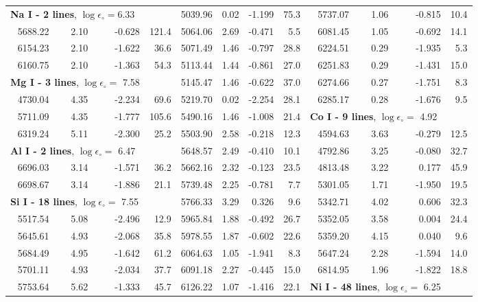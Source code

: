 \documentclass[oldversion]{aa}
\begin{document}
\begin{table}[!t]
\begin{tabular}{c c r r | c c r r | c c r r}
\multicolumn{3}{l}{\textbf{Na I - 2 lines}, $\log\epsilon_\circ=6.33$} & & 5039.96 & 0.02 & -1.199 &  75.3 & 5737.07 & 1.06 & -0.815 &  10.4\\
5688.22 & 2.10 & -0.628 & 121.4 & 5064.06 & 2.69 & -0.471 &   5.5 & 6081.45 & 1.05 & -0.692 &  14.1\\
6154.23 & 2.10 & -1.622 &  36.6 & 5071.49 & 1.46 & -0.797 &  28.8 & 6224.51 & 0.29 & -1.935 &   5.3\\
6160.75 & 2.10 & -1.363 &  54.3 & 5113.44 & 1.44 & -0.861 &  27.0 & 6251.83 & 0.29 & -1.431 &  15.0\\
\multicolumn{3}{l}{\textbf{Mg I - 3 lines}, $\log\epsilon_\circ=$ 7.58} & & 5145.47 & 1.46 & -0.622 &  37.0 & 6274.66 & 0.27 & -1.751 &   8.3\\
4730.04 & 4.35 & -2.234 &  69.6 & 5219.70 & 0.02 & -2.254 &  28.1 & 6285.17 & 0.28 & -1.676 &   9.5\\
5711.09 & 4.35 & -1.777 & 105.6 & 5490.16 & 1.46 & -1.008 &  21.4 & \multicolumn{3}{l}{\textbf{Co I - 9 lines}, $\log\epsilon_\circ=$ 4.92} & \\
6319.24 & 5.11 & -2.300 &  25.2 & 5503.90 & 2.58 & -0.218 &  12.3 & 4594.63 & 3.63 & -0.279 &  12.5\\
\multicolumn{3}{l}{\textbf{Al I - 2 lines}, $\log\epsilon_\circ=$ 6.47} & & 5648.57 & 2.49 & -0.410 &  10.1 & 4792.86 & 3.25 & -0.080 &  32.7\\
6696.03 & 3.14 & -1.571 &  36.2 & 5662.16 & 2.32 & -0.123 &  23.5 & 4813.48 & 3.22 &  0.177 &  45.9\\
6698.67 & 3.14 & -1.886 &  21.1 & 5739.48 & 2.25 & -0.781 &   7.7 & 5301.05 & 1.71 & -1.950 &  19.5\\
\multicolumn{3}{l}{\textbf{Si I - 18 lines}, $\log\epsilon_\circ=$ 7.55} & & 5766.33 & 3.29 &  0.326 &   9.6 & 5342.71 & 4.02 &  0.606 &  32.3\\
5517.54 & 5.08 & -2.496 &  12.9 & 5965.84 & 1.88 & -0.492 &  26.7 & 5352.05 & 3.58 &  0.004 &  24.4\\
5645.61 & 4.93 & -2.068 &  35.8 & 5978.55 & 1.87 & -0.602 &  22.6 & 5359.20 & 4.15 &  0.040 &   9.6\\
5684.49 & 4.95 & -1.642 &  61.2 & 6064.63 & 1.05 & -1.941 &   8.3 & 5647.24 & 2.28 & -1.594 &  14.0\\
5701.11 & 4.93 & -2.034 &  37.7 & 6091.18 & 2.27 & -0.445 &  15.0 & 6814.95 & 1.96 & -1.822 &  18.8\\
5753.64 & 5.62 & -1.333 &  45.7 & 6126.22 & 1.07 & -1.416 &  22.1 & \multicolumn{3}{l}{\textbf{Ni I - 48 lines}, $\log\epsilon_\circ=$ 6.25} & \\

\end{tabular}
\end{table}
\end{document}
